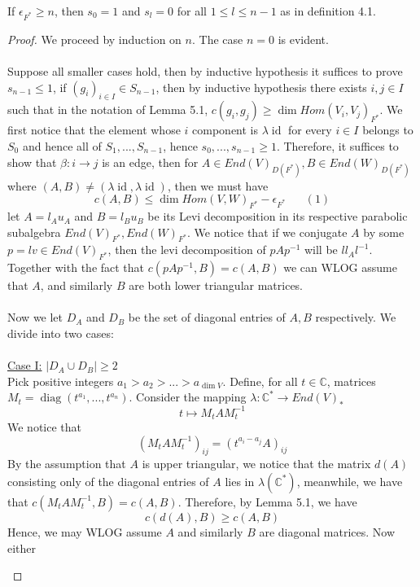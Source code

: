 \documentclass[10pt,a4paper]{amsart}
\begin{document}
\begin{thm} If $\epsilon_{F^*}\geq n$, then $s_0=1$ and $s_l=0$ for all $1\leq l\leq n-1$ as in definition 4.1.
\end{thm}

\begin{proof}
We proceed by induction on $n$. The case $n=0$ is evident.
\\~\\ Suppose all smaller cases hold, then by inductive hypothesis it suffices to prove $s_{n-1}\leq1$, if $(g_i)_{i\in I}\in S_{n-1}$, then by inductive hypothesis there exists $i,j\in I$ such that in the notation of Lemma 5.1, $c(g_i,g_j)\geq \dim Hom(V_i,V_j)_{F^*}$. 
We first notice that the element whose $i$ component is $\lambda \operatorname{id}$ for every $i\in I$ belongs to $S_0$ and hence all of $S_1,...,S_{n-1}$, hence $s_0,...,s_{n-1}\geq 1$. Therefore, it suffices to show that $\beta:i\to j$ is an edge, then for $A\in End(V)_{D(F^*)},B\in End(W)_{D(F^*)}$ where $(A,B)\neq (\lambda \operatorname{id},\lambda\operatorname{id})$, then we must have
$$c(A,B)\leq \dim Hom(V,W)_{F^*}-\epsilon_{F^*}\hspace{20pt}(1)$$
let $A=l_Au_A$ and $B=l_Bu_B$ be its Levi decomposition in its respective parabolic subalgebra $End(V)_{F^*},End(W)_{F^*}$. We notice that if we conjugate $A$ by some $p=lv\in End(V)_{F^*}$, then the levi decomposition of $pAp^{-1}$ will be $ll_Al^{-1}$. Together with the fact that $c(pAp^{-1},B)=c(A,B)$ we can WLOG assume that $A$, and similarly $B$ are both lower triangular matrices.
\\~\\ Now we let $D_A$ and $D_B$ be the set of diagonal entries of $A,B$ respectively. We divide into two cases:
\\~\\\underline{Case I:} $|D_{A}\cup D_B|\geq 2$
\\ Pick positive integers $a_1>a_2>...>a_{\dim V}$. Define, for all $t\in\mathbb C$, matrices $M_t=\operatorname{diag}(t^{a_1},...,t^{a_n})$. Consider the mapping $\lambda:\mathbb C^*\to End(V)_{*}$ 
$$t\mapsto M_tAM_t^{-1}$$
We notice that 
$$(M_tAM_t^{-1})_{ij}=(t^{a_i-a_j}A)_{ij}$$
By the assumption that $A$ is upper triangular, we notice that the matrix $d(A)$ consisting only of the diagonal entries of $A$ lies in $\lambda(\mathbb C^*)$, meanwhile, we have that $c(M_tAM_t^{-1},B)=c(A,B)$.
Therefore, by Lemma 5.1, we have 
$$c(d(A),B)\geq c(A,B)$$
Hence, we may WLOG assume $A$ and similarly $B$ are diagonal matrices. Now  either
\begin{enumerate}

\end{enumerate}
\end{proof}
\end{document}
